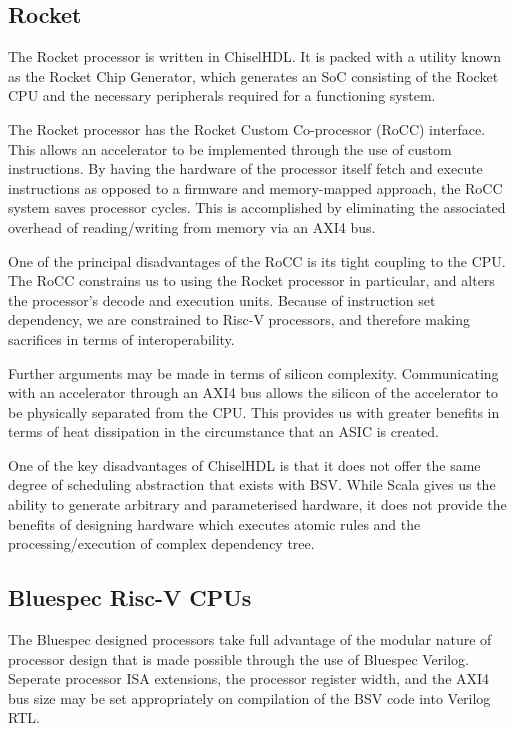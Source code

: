\documentclass[a4paper,8pt]{report}
\begin{document}
\subsection{Rocket}
The Rocket processor is written in ChiselHDL. It is packed with a utility known
as the Rocket Chip Generator, which generates an SoC consisting of the Rocket
CPU and the necessary peripherals required for a functioning system. 


The Rocket processor has the Rocket Custom Co-processor (RoCC) interface. This
allows an accelerator to be implemented through the use of custom instructions.
By having the hardware of the processor itself fetch and execute instructions as
opposed to a firmware and memory-mapped approach, the RoCC system saves
processor cycles. This is accomplished by eliminating the associated overhead of
reading/writing from memory via an AXI4 bus.

One of the principal disadvantages of the RoCC is its tight coupling to the CPU.
The RoCC constrains us to using the Rocket processor in particular, and alters
the processor's decode and execution units. Because of instruction set
dependency, we are constrained to Risc-V processors, and therefore making
sacrifices in terms of interoperability. 

Further arguments may be made in terms of silicon complexity. Communicating with
an accelerator through an AXI4 bus allows the silicon of the accelerator to be
physically separated from the CPU. This provides us with greater benefits in
terms of heat dissipation in the circumstance that an ASIC is created.

One of the key disadvantages of ChiselHDL is that it does not offer the same
degree of scheduling abstraction that exists with BSV. While Scala gives us the
ability to generate arbitrary and parameterised hardware, it does not provide
the benefits of designing hardware which executes atomic rules and the
processing/execution of complex dependency tree.

\subsection{Bluespec Risc-V CPUs}
The Bluespec designed processors take full advantage of the modular nature of
processor design that is made possible through the use of Bluespec Verilog.
Seperate processor ISA extensions, the processor register width, and the AXI4
bus size may be set appropriately on compilation of the BSV code into Verilog
RTL.
\end{document}
